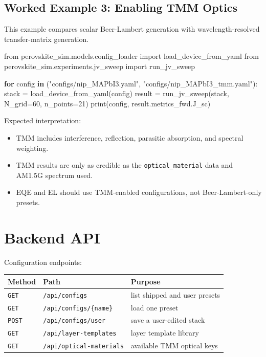 \documentclass[
  11pt,
  american,
]{report}
\newenvironment{Shaded}{}{}
\newcommand{\BuiltInTok}[1]{#1}
\newcommand{\ControlFlowTok}[1]{\textcolor[rgb]{0.00,0.44,0.13}{\textbf{#1}}}
\newcommand{\DecValTok}[1]{\textcolor[rgb]{0.25,0.63,0.44}{#1}}
\newcommand{\ImportTok}[1]{#1}
\newcommand{\KeywordTok}[1]{\textcolor[rgb]{0.00,0.44,0.13}{\textbf{#1}}}
\newcommand{\NormalTok}[1]{#1}
\newcommand{\OperatorTok}[1]{\textcolor[rgb]{0.40,0.40,0.40}{#1}}
\newcommand{\StringTok}[1]{\textcolor[rgb]{0.25,0.44,0.63}{#1}}
\providecommand{\tightlist}{%
  \setlength{\itemsep}{0pt}\setlength{\parskip}{0pt}}
\begin{document}
\hypertarget{worked-example-3-enabling-tmm-optics}{%
\section{Worked Example 3: Enabling TMM
Optics}\label{worked-example-3-enabling-tmm-optics}}

This example compares scalar Beer-Lambert generation with
wavelength-resolved transfer-matrix generation.

\begin{Shaded}
\begin{Highlighting}[]
\ImportTok{from}\NormalTok{ perovskite\_sim.models.config\_loader }\ImportTok{import}\NormalTok{ load\_device\_from\_yaml}
\ImportTok{from}\NormalTok{ perovskite\_sim.experiments.jv\_sweep }\ImportTok{import}\NormalTok{ run\_jv\_sweep}

\ControlFlowTok{for}\NormalTok{ config }\KeywordTok{in}\NormalTok{ (}\StringTok{"configs/nip\_MAPbI3.yaml"}\NormalTok{, }\StringTok{"configs/nip\_MAPbI3\_tmm.yaml"}\NormalTok{):}
\NormalTok{    stack }\OperatorTok{=}\NormalTok{ load\_device\_from\_yaml(config)}
\NormalTok{    result }\OperatorTok{=}\NormalTok{ run\_jv\_sweep(stack, N\_grid}\OperatorTok{=}\DecValTok{60}\NormalTok{, n\_points}\OperatorTok{=}\DecValTok{21}\NormalTok{)}
    \BuiltInTok{print}\NormalTok{(config, result.metrics\_fwd.J\_sc)}
\end{Highlighting}
\end{Shaded}

Expected interpretation:

\begin{itemize}
\tightlist
\item
  TMM includes interference, reflection, parasitic absorption, and
  spectral weighting.
\item
  TMM results are only as credible as the \texttt{optical\_material}
  data and AM1.5G spectrum used.
\item
  EQE and EL should use TMM-enabled configurations, not
  Beer-Lambert-only presets.
\end{itemize}

\hypertarget{backend-api}{%
\chapter{Backend API}\label{backend-api}}

Configuration endpoints:

\begin{longtable}[]{@{}lll@{}}
\toprule
Method & Path & Purpose \\
\midrule
\endhead
\texttt{GET} & \texttt{/api/configs} & list shipped and user presets \\
\texttt{GET} & \texttt{/api/configs/\{name\}} & load one preset \\
\texttt{POST} & \texttt{/api/configs/user} & save a user-edited stack \\
\texttt{GET} & \texttt{/api/layer-templates} & layer template library \\
\texttt{GET} & \texttt{/api/optical-materials} & available TMM optical
keys \\
\bottomrule
\end{longtable}
\end{document}
